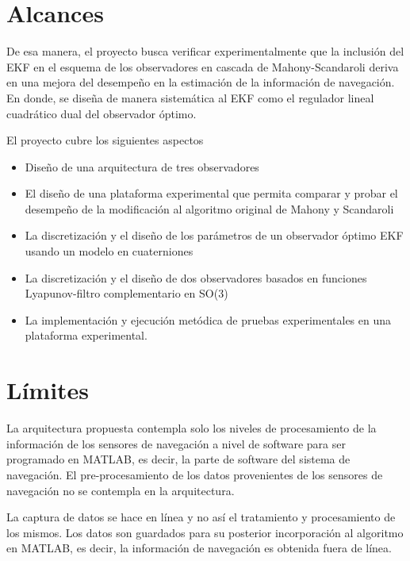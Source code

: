 \documentclass[10pt]{report}
\numberwithin{equation}{chapter}
\numberwithin{algorithm}{chapter}
\begin{document}
\section{Alcances}
De esa manera, el proyecto busca verificar experimentalmente que la inclusión del EKF en el esquema de los observadores en cascada de Mahony-Scandaroli deriva en una mejora del desempeño en la estimación de la información de navegación. En donde, se diseña de manera sistemática al EKF como el regulador lineal cuadrático dual del observador óptimo.\par
El proyecto cubre los siguientes aspectos
\begin{itemize}
\item Diseño de una arquitectura de tres observadores
\item El diseño de una plataforma experimental que permita comparar y probar el desempeño de la modificación al algoritmo original de Mahony y Scandaroli
\item La discretización y el diseño de los parámetros de un observador óptimo EKF usando un modelo en cuaterniones
\item La discretización y el diseño de dos observadores basados en funciones Lyapunov-filtro complementario en SO(3)
\item La implementación y ejecución metódica de pruebas experimentales en una plataforma experimental.
\end{itemize}
\section{Límites}
La arquitectura propuesta contempla solo los niveles de procesamiento de la información de los sensores de navegación a nivel de software para ser programado en MATLAB, es decir, la parte de software del sistema de navegación. El pre-procesamiento de los datos provenientes de los sensores de navegación no se contempla en la arquitectura.\par La captura de datos se hace en línea y no así el tratamiento y procesamiento de los mismos. Los datos son guardados para su posterior incorporación al algoritmo en MATLAB, es decir, la información de navegación es obtenida fuera de línea. %
\newpage
\end{document}
